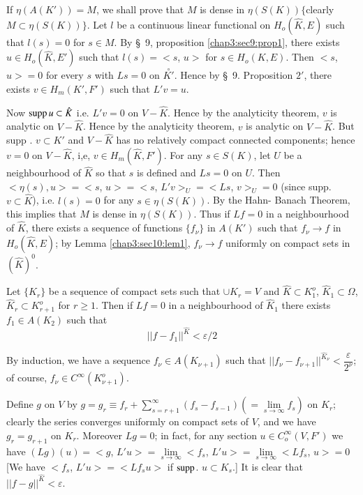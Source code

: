If $\eta (A(K')) = M$, we shall prove that $M$
is dense in $\eta (S(K)) \{$clearly  $M \subset \eta
(S(K))\}$. Let $l$ be a continuous linear functional on $H_o (\hat{K}, E)$
such that $l(s) = 0$ for $s \in M$. By \S\ 9,
proposition \ref{chap3:sec9:prop1}, there
exists $u \in H_o (\hat{K}, E')$ such that $l(s) = < s$, $u >$ for $s \in
H_o (K, E)$. Then $< s$, $u > = 0$ for every $s$ with $Ls =0$ on
$\overset{\circ}{K'}$. Hence by \S\ 9. Proposition $2'$, there exists $v \in H_m (K',
F')$ such that $L' v = u$. 

Now $\operatorname{supp} u \subset \hat{K}$ i.e. $L'v = 0$ on $V- \hat{K}$. Hence by
the analyticity theorem, $v$ is analytic on $V - \hat{K}$. Hence by
the analyticity theorem, $v$ is analytic on $V- \hat{K}$. But supp
. $v \subset K'$ and $V- \hat{K}$ has no relatively compact connected
components; hence $v=0$ on $V- \hat{K}$, i,e, $v \in H_m (\hat{K},
F')$. For any $s \in S(K)$, let $U$ be a neighbourhood of $\hat{K}$ so
that $s$ is defined and $Ls = 0$ on $U$. Then $< \eta (s), u > = < s$,
$u    >  = < s$, $L'v >_U = < Ls$, $v >_U = 0$ (since supp. $v
\subset \hat{K}$), i.e. $l(s) = 0$ for any $s \in \eta (S(K))$. By the
Hahn- Banach Theorem, this implies that $M$ is dense in $\eta
(S(K))$. Thus if $Lf = 0$ in a neighbourhood of $\hat{K}$, there\pageoriginale
exists a sequence of functions $\{ f_{\nu} \}$ in $A(K')$ such that
$f_{\nu} \to f$ in $H_o (\hat{K}, E)$; by Lemma \ref{chap3:sec10:lem1}, $f _{\nu} \to f$
uniformly on compact sets in $(\hat{K})^0$. 

Let $\{K_r \}$ be a sequence of compact sets such that $\cup K_r = V$
and $\hat{K} \subset K^o_1$, $\hat{K}_1 \subset \Omega$, $\hat{K}_r
\subset K^o _{r+1}$ for $r \geq 1$. Then if $Lf =0$ in a neighbourhood
of $\hat{K}_1$ there exists $f_1 \in A(K_2)$ such that 
$$
|| f-f_1 ||^{\hat{K}} < \varepsilon /2
$$

By induction, we have a sequence $f _{\nu} \in A(K_{\nu +1})$ such
that $|| f_{\nu} - f_{\nu +1} || ^{\hat{K}_\nu} <
\dfrac{\varepsilon}{2^{\nu}}$; of course, $f_{\nu} \in C^{\infty}
(K^{o}_{\nu +1})$. 

Define $g$ on $V$ by $g = g_r  \equiv f_r + \sum\limits_{s=
  r+1}^{\infty} (f_s - f_{s-1}) (= \lim\limits_{s \to \infty} f_s)$ on
$K_r$; clearly the series converges uniformly on compact sets of $V$,
and we have $g_r = g_{r+1}$ on $K_r$. Moreover $Lg =0$; in fact, for
any section $u \in C^{\infty}_o (V, F')$ we have $(Lg ) (u) = < g$,
$L'u > = \lim\limits_{s \to \infty} < f_s$, $L'u > = \lim\limits_{s
  \to \infty}  < L f_s$, $u > = 0$ [We have $< f_s$, $L' u > = < Lf_s
  u > $ if $\operatorname{supp}$. $u \subset K_s$.] It is clear that $|| f-g
||^{\hat{K}} < \varepsilon$. 

